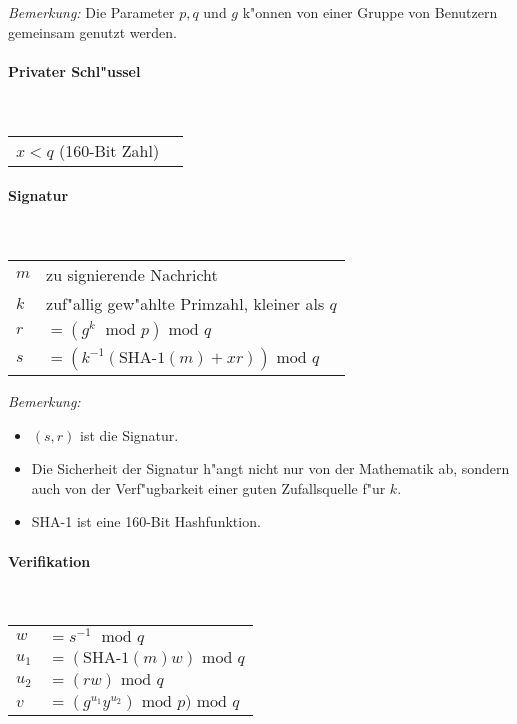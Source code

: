 \emph{Bemerkung:} Die Parameter $p,q$ und $g$ k"onnen von einer Gruppe von
Benutzern gemeinsam genutzt werden.

\paragraph{Privater Schl"ussel}\strut\\
\begin{tabular}{l@{ }l}
$x < q$ (160-Bit Zahl) 
\end{tabular}

\paragraph{Signatur}\strut\\
\begin{tabular}{l@{ }l}
$m$ & zu signierende Nachricht\\
$k$ & zuf"allig\index{Zufall} gew"ahlte Primzahl, kleiner als $q$\\
$r$ & $= (g^k \; \mbox{ mod } p) \mbox{ mod } q$\\
$s$ & $= (k^{-1}(\mbox{SHA-1}(m) + xr)) \mbox{ mod } q$
\end{tabular}

\emph{Bemerkung:}
\begin{itemize}
\item $(s,r)$ ist die Signatur.
\item Die Sicherheit der Signatur h"angt nicht nur von der Mathematik ab,
sondern auch von der Verf"ugbarkeit einer guten Zufallsquelle
f"ur $k$.
\item SHA-1  ist eine 160-Bit Hashfunktion.

\end{itemize}
\paragraph{Verifikation}\strut\\
\begin{tabular}{l@{ }l}
$w$ & $= s^{-1} \;  \mbox{ mod } q$\\
$u_1$ & $= (\mbox{SHA-1}(m)w) \mbox{ mod } q$\\
$u_2$ & $= (rw)  \mbox{ mod } q$\\
$v$ & $= (g^{u_1}y^{u_2}) \mbox{ mod } p)  \mbox{ mod } q$\\

\end{tabular}

